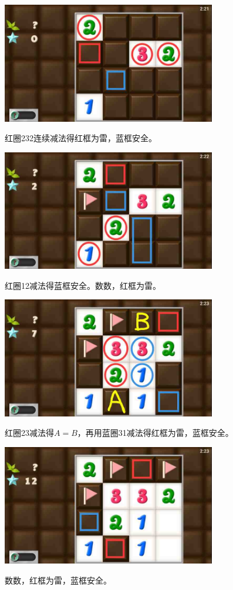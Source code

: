 \subsection{} %
\begin{center}
    \includegraphics[width=0.7\textwidth]{puzzlelow/145-1.jpg}
\end{center}
红圈232连续减法得红框为雷，蓝框安全。
\begin{center}
    \includegraphics[width=0.7\textwidth]{puzzlelow/145-2.jpg}
\end{center}
红圈12减法得蓝框安全。数数，红框为雷。
\begin{center}
    \includegraphics[width=0.7\textwidth]{puzzlelow/145-3.jpg}
\end{center}
红圈23减法得$A=B$，再用蓝圈31减法得红框为雷，蓝框安全。
\begin{center}
    \includegraphics[width=0.7\textwidth]{puzzlelow/145-4.jpg}
\end{center}
数数，红框为雷，蓝框安全。

